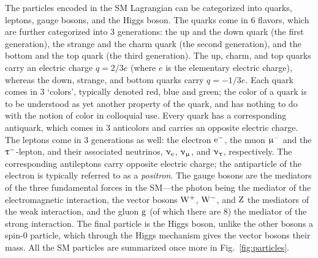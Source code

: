 The particles encoded in the SM Lagrangian can be categorized into quarks, leptons, gauge bosons, and the Higgs boson.
% 
The quarks come in 6 flavors, which are further categorized into 3 generations: the up and the down quark (the first generation), the strange and the charm quark (the second generation), and the bottom and the top quark (the third generation).
% 
The up, charm, and top quarks carry an electric charge $q = 2/3e$ (where $e$ is the elementary electric charge), whereas the down, strange, and bottom quarks carry $q=-1/3e$.
% 
Each quark comes in 3 `colors', typically denoted red, blue and green; the color of a quark is to be understood as yet another property of the quark, and has nothing to do with the notion of color in colloquial use.
% 
Every quark has a corresponding antiquark, which comes in 3 anticolors and carries an opposite electric charge.
% 
The leptons come in 3 generations as well: the electron $\mathrm{e}^-$, the muon $\upmu^-$ and the $\uptau^-$-lepton, and their associated neutrinos, $\upnu_\mathrm{e}$, $\upnu_\upmu$, and $\upnu_\uptau$, respectively.
% 
The corresponding antileptons carry opposite electric charge; the antiparticle of the electron is typically referred to as a \textit{positron}.
% 
The gauge bosons are the mediators of the three fundamental forces in the SM---the photon being the mediator of the electromagnetic interaction, the vector bosons $\mathrm{W}^+$, $\mathrm{W}^-$, and $\mathrm{Z}$ the mediators of the weak interaction, and the gluon $\mathrm{g}$ (of which there are 8) the mediator of the strong interaction.
% 
The final particle is the Higgs boson, unlike the other bosons a spin-0 particle, which through the Higgs mechanism gives the vector bosons their mass.
% 
All the SM particles are summarized once more in Fig.~\ref{fig:particles}.

